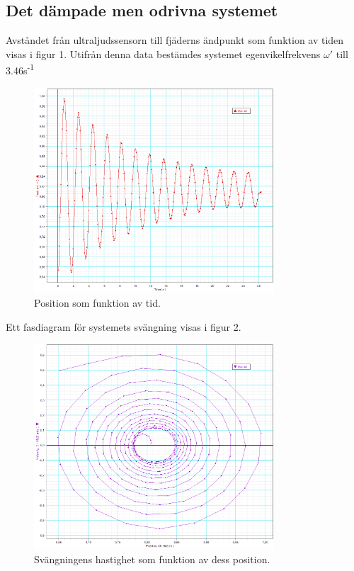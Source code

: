 \documentclass[a4paper,10pt]{article}
\begin{document}
\subsection{Det dämpade men odrivna systemet}
Avståndet från ultraljudssensorn till fjäderns ändpunkt som funktion av tiden visas i figur 1. Utifrån denna data bestämdes systemet egenvikelfrekvens $\omega'$ till 3.46s\textsuperscript{-1}
\begin{figure}[H]
	\centering
	\includegraphics[width=0.8\textwidth]{../bilder/pos_vs_tid_uppg1.png}
	\caption{Position som funktion av tid.}
\end{figure}
Ett fasdiagram för systemets svängning visas i figur 2.
\begin{figure}[H]
	\centering
	\includegraphics[width=0.8\textwidth]{../bilder/fasdiagram_uppg1.png}
	\caption{Svängningens hastighet som funktion av dess position.}
\end{figure}
\end{document}
